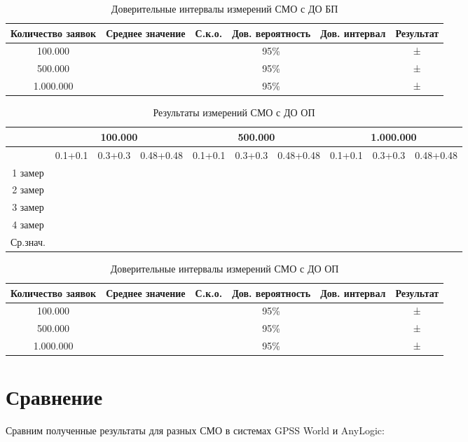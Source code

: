 \documentclass[a4paper,14pt]{report} %
\begin{document}
\begin{table}[h!]
\caption{Доверительные интервалы измерений СМО с ДО БП}
\begin{tabular}{|c|c|c|c|c|c|}
\hline
 Количество заявок & Среднее значение & С.к.о. & Дов. вероятность & Дов. интервал & Результат\\
\hline
100.000 &  &  & 95\% & &  ±  \\
\hline
500.000 &  &  & 95\% &  &  ±  \\
\hline
1.000.000 &  &  & 95\% & &  ±  \\
\hline
\end{tabular}
\end{table} 

\begin{table}[h!]
\caption{Результаты измерений СМО с ДО ОП}
\begin{tabular}{|c|c|c|c|c|c|c|c|c|c|}
\hline
 & \multicolumn{3}{|c|}{100.000} & \multicolumn{3}{|c|}{500.000} & \multicolumn{3}{|c|}{1.000.000} \\
\hline
 & 0.1+0.1 & 0.3+0.3 & 0.48+0.48 & 0.1+0.1 & 0.3+0.3 & 0.48+0.48 & 0.1+0.1 & 0.3+0.3 & 0.48+0.48 \\
\hline
1 замер &   &  &  &  &  &  &  &  &     \\
\hline
2 замер &  &  &  &  &  &  &  &  &   \\
\hline
3 замер &   &  &  &  &  &  &  &  &    \\
\hline
4 замер &   &  &  &  &  &  &  &  &  \\
\hline
Ср.знач. &   &  &  &  &  &  &  &  &   \\
\hline
\end{tabular}
\end{table} 

\begin{table}[h!]
\caption{Доверительные интервалы измерений СМО с ДО ОП}
\begin{tabular}{|c|c|c|c|c|c|}
\hline
 Количество заявок & Среднее значение & С.к.о. & Дов. вероятность & Дов. интервал & Результат\\
\hline
100.000 &  & & 95\% &  &  ±  \\
\hline
500.000 &  &  & 95\% &  &  ±  \\
\hline
1.000.000 &   & & 95\% &  &  ±  \\
\hline
\end{tabular}
\end{table} 

\section{Сравнение}
Сравним полученные результаты для разных СМО в системах GPSS World и AnyLogic: 
\end{document}
